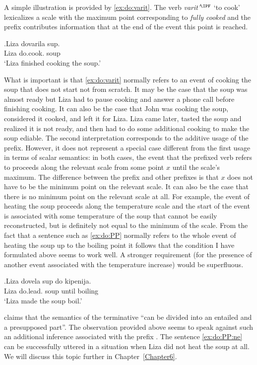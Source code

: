 A simple illustration is provided by \ref{ex:do:varit}. The verb \textit{varit'}$^{\IPF}$ `to cook' lexicalizes a scale with the maximum point corresponding to \textit{fully cooked} and the prefix  contributes information that at the end of the event this point is reached. 

\exg.\label{ex:do:varit}Liza dovarila sup.\\
Liza do.cook. soup\\
\trans `Liza finished cooking the soup.'

What is important is that \ref{ex:do:varit} normally refers to an event of cooking the soup that does not start not from scratch. It may be the case that the soup was almost ready but Liza had to pause cooking and answer a phone call before finishing cooking. It can also be the case that John was cooking the soup, considered it cooked, and left it for Liza. Liza came later, tasted the soup and realized it is not ready, and then had to do some additional cooking to make the soup ediable. The second interpretation corresponds to the additive usage of the prefix. However, it does not represent a special case different from the first usage in terms of scalar semantics: in both cases, the event that the prefixed verb refers to proceeds along the relevant scale from some point $x$ until the scale's maximum. The difference between the prefix  and other prefixes is that $x$ does not have to be the minimum point on the relevant scale. It can also be the case that there is no minimum point on the relevant scale at all. For example, the event of heating the soup proceeds along the temperature scale and the start of the event is associated with some temperature of the soup that cannot be easily reconstructed, but is definitely not equal to the minimum of the scale. From the fact that a sentence such as \ref{ex:do:PP} normally refers to the whole event of heating the soup up to the boiling point it follows that the condition I have formulated above seems to work well. A stronger requirement (for the presence of another event associated with the temperature increase) would be superfluous.

\exg.\label{ex:do:PP}Liza dovela sup do kipenija.\\
Liza do.lead. soup until boiling\\
\trans `Liza made the soup boil.'

\citet[75]{Kagan:book} claims that the semantics of the terminative  ``can be divided into an entailed and a presupposed part''. The observation provided above seems to speak against such an additional inference associated with the prefix . The sentence \ref{ex:do:PP:ne} can be successfully uttered in a situation when Liza did not heat the soup at all. We will discuss this topic further in Chapter~\ref{Chapter6}.

